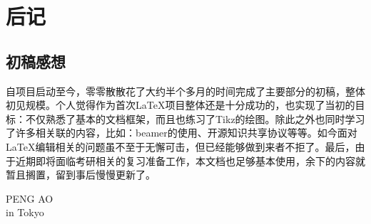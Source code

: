
\chapter{后记}

\section*{初稿感想}
自项目启动至今，零零散散花了大约半个多月的时间完成了主要部分的初稿，整体初见规模。个人觉得作为首次\LaTeX 项目整体还是十分成功的，也实现了当初的目标：不仅熟悉了基本的文档框架，而且也练习了Tikz的绘图。除此之外也同时学习了许多相关联的内容，比如：beamer的使用、开源知识共享协议等等。如今面对\LaTeX 编辑相关的问题虽不至于无懈可击，但已经能够做到来者不拒了。最后，由于近期即将面临考研相关的复习准备工作，本文档也足够基本使用，余下的内容就暂且搁置，留到事后慢慢更新了。

\begin{flushright}
    PENG AO\\
     in Tokyo
\end{flushright}
